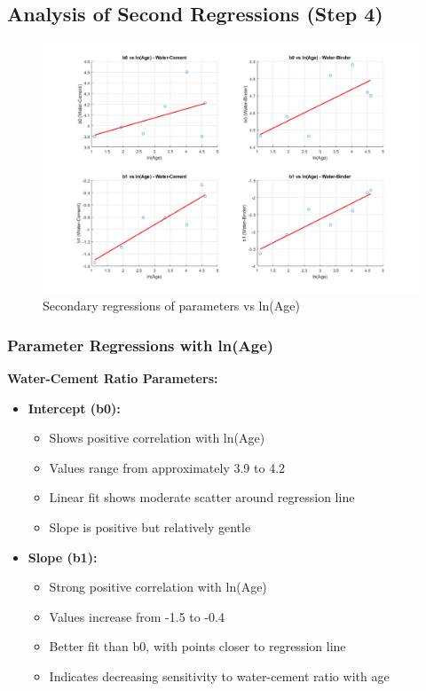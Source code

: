\documentclass[a4paper,11pt]{article}
\begin{document}
\subsection*{Analysis of Second Regressions (Step 4)}
\begin{figure}[htbp]
    \centering
    \includegraphics[width=\textwidth]{parameter_regressions.png}
    \caption{Secondary regressions of parameters vs ln(Age)}
    \label{fig:parameter_regressions}
\end{figure}


\subsubsection*{Parameter Regressions with ln(Age)}

\textbf{Water-Cement Ratio Parameters:}
\begin{itemize}
    \item \textbf{Intercept (b0):}
        \begin{itemize}
            \item Shows positive correlation with ln(Age)
            \item Values range from approximately 3.9 to 4.2
            \item Linear fit shows moderate scatter around regression line
            \item Slope is positive but relatively gentle
        \end{itemize}
    \item \textbf{Slope (b1):}
        \begin{itemize}
            \item Strong positive correlation with ln(Age)
            \item Values increase from -1.5 to -0.4
            \item Better fit than b0, with points closer to regression line
            \item Indicates decreasing sensitivity to water-cement ratio with age
        \end{itemize}
\end{itemize}
\end{document}
